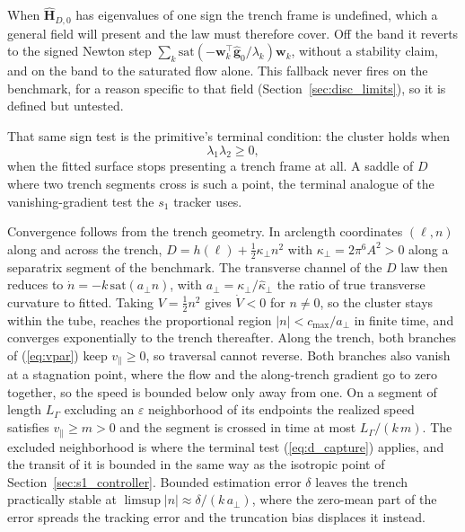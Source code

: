 \documentclass[lettersize,journal]{IEEEtran}
\begin{document}
When $\hat{\mathbf{H}}_{D,0}$ has eigenvalues of one sign the trench
frame is undefined, which a general field will present and the law must
therefore cover. Off the band it reverts to the signed Newton step
$\sum_k \mathrm{sat}(-\mathbf{w}_k^\top\hat{\mathbf{g}}_0/
\lambda_k)\mathbf{w}_k$, without a stability claim, and on the band to
the saturated flow alone. This fallback never fires on the benchmark,
for a reason specific to that field (Section~\ref{sec:disc_limits}), so
it is defined but untested.

That same sign test is the primitive's terminal condition: the cluster
holds when
\begin{equation}
    \lambda_1 \lambda_2 \geq 0,
    \label{eq:d_capture}
\end{equation}
when the fitted surface stops presenting a trench frame at all. A saddle of $D$ where two trench segments cross is such a point, the terminal analogue of the vanishing-gradient test the $s_1$ tracker uses.

Convergence follows from the trench geometry. In arclength coordinates $(\ell, n)$ along and across the trench, $D = h(\ell) + \tfrac{1}{2}\kappa_\perp n^2$ with $\kappa_\perp = 2\pi^6 A^2 > 0$ along a separatrix segment of the benchmark. The transverse channel of the $D$ law then reduces to $\dot{n} = -k\,\mathrm{sat}(a_\perp n)$, with $a_\perp = \kappa_\perp/\hat{\kappa}_\perp$ the ratio of true transverse curvature to fitted. Taking $V = \tfrac{1}{2}n^2$
gives $\dot{V} < 0$ for $n \neq 0$, so the cluster stays within the tube,
reaches the proportional region $|n| < c_{\max}/a_\perp$ in finite time,
and converges exponentially to the trench thereafter. Along the trench,
both branches of (\ref{eq:vpar}) keep $v_\parallel \geq 0$, so traversal
cannot reverse. Both branches also vanish at a stagnation point, where
the flow and the along-trench gradient go to zero together, so the
speed is bounded below only away from one. On a segment of length
$L_\Gamma$ excluding an $\varepsilon$ neighborhood of its endpoints the
realized speed satisfies $v_\parallel \geq m > 0$ and the segment is
crossed in time at most $L_\Gamma/(k\,m)$. The excluded neighborhood is
where the terminal test (\ref{eq:d_capture}) applies, and the transit
of it is bounded in the same way as the isotropic point of
Section~\ref{sec:s1_controller}. Bounded estimation error $\delta$ leaves the
trench practically stable at $\limsup |n| \approx \delta/(k\,a_\perp)$,
where the zero-mean part of the error spreads the tracking error and the
truncation bias displaces it instead.
\end{document}
